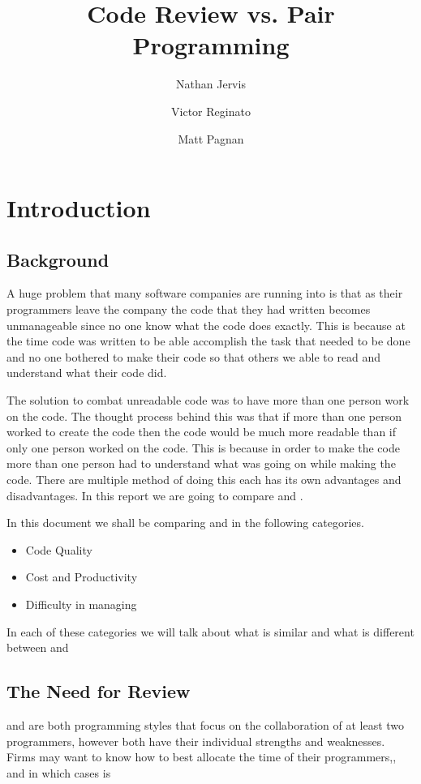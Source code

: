 \documentclass{article}
\title{Code Review vs. Pair Programming}
\author{Nathan Jervis \and Victor Reginato \and Matt Pagnan}
\begin{document}
\maketitle

\section{Introduction}

\subsection{Background}
A huge problem that many software companies are running into is that as their programmers leave the company the code that they had written becomes unmanageable since no one know what the code does exactly. This is because at the time code was written to be able accomplish the task that needed to be done and no one bothered to make their code so that others we able to read and understand what their code did.

The solution to combat unreadable code was to have more than one person work on the code. The thought process behind this was that if more than one person worked to create the code then the code would be much more readable than if only one person worked on the code. This is because in order to make the code more than one person had to understand what was going on while making the code. There are multiple method of doing this each has its own advantages and disadvantages. In this report we are going to compare \PP and \CR.

In this document we shall be comparing \PP and \CR in the following categories.
\begin{itemize}
\item Code Quality
\item Cost and Productivity
\item Difficulty in managing
\end{itemize}

In each of these categories we will talk about what is similar and what is different between \PP and \CR 


\subsection{The Need for Review}
\PP and \CR are both programming styles that focus on the collaboration of at least two programmers, however both have their individual strengths and weaknesses. Firms may want to know how to best allocate the time of their programmers,, and in which cases \PP is 
\end{document}

